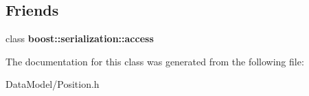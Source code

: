 \subsection*{Friends}
\begin{DoxyCompactItemize}
\item 
\hypertarget{classPosition_ac98d07dd8f7b70e16ccb9a01abf56b9c}{class {\bfseries boost\-::serialization\-::access}}\label{classPosition_ac98d07dd8f7b70e16ccb9a01abf56b9c}

\end{DoxyCompactItemize}


The documentation for this class was generated from the following file\-:\begin{DoxyCompactItemize}
\item 
Data\-Model/Position.\-h\end{DoxyCompactItemize}
